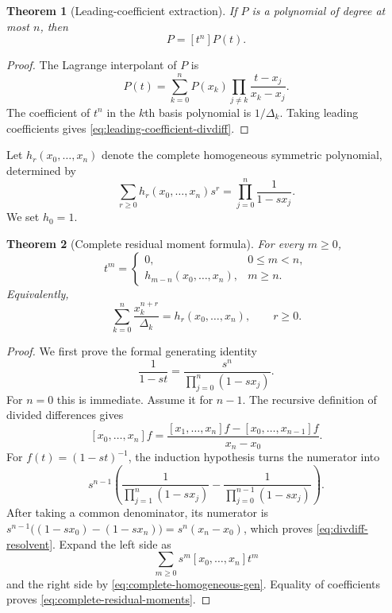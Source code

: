\documentclass[11pt,oneside,openany]{book}
\newtheorem{theorem}{Theorem}[chapter]
\theoremstyle{definition}
\theoremstyle{remark}
\begin{document}
\begin{theorem}[Leading-coefficient extraction]\label{thm:leading-coefficient-divdiff}
If $P$ is a polynomial of degree at most $n$, then
\begin{equation}
 [x_0,\ldots,x_n]P=[t^n]P(t).\label{eq:leading-coefficient-divdiff}
\end{equation}
\end{theorem}

\begin{proof}
The Lagrange interpolant of $P$ is
\[
 P(t)=\sum_{k=0}^nP(x_k)
 \prod_{j\ne k}\frac{t-x_j}{x_k-x_j}.
\]
The coefficient of $t^n$ in the $k$th basis polynomial is $1/\Delta_k$.  Taking leading coefficients gives \eqref{eq:leading-coefficient-divdiff}.
\end{proof}

Let $h_r(x_0,\ldots,x_n)$ denote the complete homogeneous symmetric polynomial, determined by
\begin{equation}
 \sum_{r\ge0}h_r(x_0,\ldots,x_n)s^r
 =\prod_{j=0}^n\frac1{1-sx_j}.\label{eq:complete-homogeneous-gen}
\end{equation}
We set $h_0=1$.

\begin{theorem}[Complete residual moment formula]\label{thm:complete-residual-moments}
For every $m\ge0$,
\begin{equation}
 [x_0,\ldots,x_n]t^m=
 \begin{cases}
 0,&0\le m<n,\\
 h_{m-n}(x_0,\ldots,x_n),&m\ge n.
 \end{cases}\label{eq:complete-residual-moments}
\end{equation}
Equivalently,
\begin{equation}
 \sum_{k=0}^n\frac{x_k^{n+r}}{\Delta_k}
 =h_r(x_0,\ldots,x_n),\qquad r\ge0.\label{eq:complete-residual-moments-r}
\end{equation}
\end{theorem}

\begin{proof}
We first prove the formal generating identity
\begin{equation}
 [x_0,\ldots,x_n]\frac1{1-st}
 =\frac{s^n}{\prod_{j=0}^n(1-sx_j)}.\label{eq:divdiff-resolvent}
\end{equation}
For $n=0$ this is immediate.  Assume it for $n-1$.  The recursive definition of divided differences gives
\[
 [x_0,\ldots,x_n]f
 =\frac{[x_1,\ldots,x_n]f-[x_0,\ldots,x_{n-1}]f}{x_n-x_0}.
\]
For $f(t)=(1-st)^{-1}$, the induction hypothesis turns the numerator into
\[
 s^{n-1}\left(
 \frac1{\prod_{j=1}^n(1-sx_j)}
 -\frac1{\prod_{j=0}^{n-1}(1-sx_j)}
 \right).
\]
After taking a common denominator, its numerator is
$ s^{n-1}\bigl((1-sx_0)-(1-sx_n)\bigr)
 =s^n(x_n-x_0)$, which proves \eqref{eq:divdiff-resolvent}.  Expand the left side as
\[
 \sum_{m\ge0}s^m[x_0,\ldots,x_n]t^m
\]
and the right side by \eqref{eq:complete-homogeneous-gen}.  Equality of coefficients proves \eqref{eq:complete-residual-moments}.
\end{proof}
\end{document}
